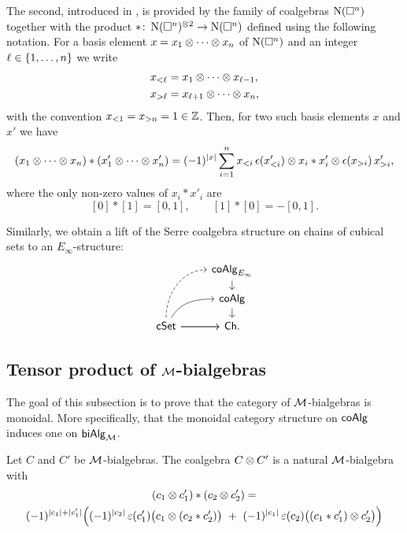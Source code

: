 The second, introduced in \cite{medina2022cube_einfty}, is provided by the family of coalgebras $\operatorname{N}(\square^n)$ together with the product $\ast \colon \operatorname{N}(\square^n)^{\otimes 2} \to \operatorname{N}(\square^n)$ defined using the following notation.
For a basis element $x = x_1 \otimes \dotsb \otimes x_n$ of $\operatorname{N}(\square^n)$ and an integer $\ell \in \{1,\dots,n\}$ we write
\begin{align*}
	x_{<\ell} & = x_1 \otimes \dotsb \otimes x_{\ell-1}, \\
	x_{>\ell} & = x_{\ell+1} \otimes \dotsb \otimes x_n,
\end{align*}
with the convention $x_{<1} = x_{>n} = 1 \in \mathbb{Z}$.
Then, for two such basis elements $x$ and $x'$ we have
\begin{multline*}
	(x_1 \otimes \dotsb \otimes x_n) \ast (x'_1 \otimes \dotsb \otimes x'_n)
	=
	(-1)^{|x|} \sum_{i=1}^n x_{<i}\, \epsilon(x'_{<i}) \otimes x_i \ast x'_i \otimes \epsilon(x_{>i}) \, x'_{>i},
\end{multline*}
where the only non-zero values of $x_i \ast x'_i$ are
\[
[0] \ast [1] = [0, 1], \qquad [1] \ast [0] = -[0, 1].
\]

Similarly, we obtain a lift of the Serre coalgebra structure on chains of cubical sets to an $E_\infty$-structure:
\begin{equation*}
	\begin{tikzcd}[column sep=normal, row sep=small]
		& \coAlg_{E_\infty} \arrow[d] \\
		& \coAlg \arrow[d] \\
		\cSet \arrow[uur, dashed, out=90, in=180] \arrow[r]
		\arrow[ur,out=60, in=180, near end]
		\arrow[r]
		& \Ch.
	\end{tikzcd}
\end{equation*}

\subsection{Tensor product of $\mathcal{M}$-bialgebras}

The goal of this subsection is to prove that the category of $\mathcal{M}$-bialgebras is monoidal.
More specifically, that the monoidal category structure on $\mathsf{coAlg}$ induces one on $\mathsf{biAlg}_{\mathcal{M}}$.

\begin{theorem*}
	Let $C$ and $C'$ be $\mathcal{M}$-bialgebras.
	The coalgebra $C \otimes C'$ is a natural $\mathcal{M}$-bialgebra with
	\begin{multline*}
		(c_1 \otimes c_1') \ast (c_2 \otimes c'_2) = \\
		(-1)^{\lvert c_1\rvert + \lvert c'_1\rvert}
		\Big(
		(-1)^{\lvert c_2\rvert} \operatorname{\varepsilon}(c'_1) \big(c_1 \otimes (c_2 \ast c'_2)\big)
		\ + \
		(-1)^{\lvert c_1\rvert} \operatorname{\varepsilon}(c_2) \big((c_1 \ast c'_1) \otimes c'_2\big)
		\Big)
	\end{multline*}
\end{theorem*}

